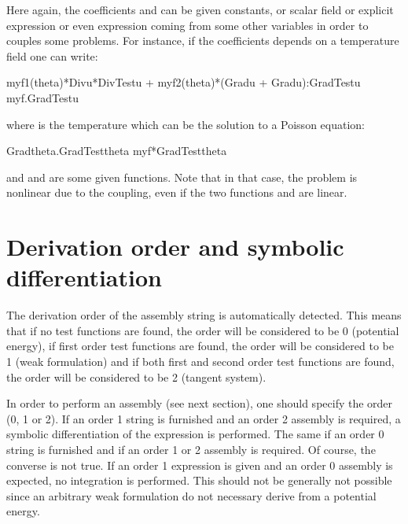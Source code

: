 \documentclass[a4paper,11pt,english]{sphinxmanual}
\begin{document}
Here again, the coefficients  and  can be given constants, or scalar field or explicit expression or even expression coming from some other variables in order to couples some problems. For instance, if the coefficients depends on a temperature field one can write:

\begin{sphinxVerbatim}[commandchars=\\\{\}]
\PYGZdq{}my\PYGZus{}f1(theta)*Div\PYGZus{}u*Div\PYGZus{}Test\PYGZus{}u + my\PYGZus{}f2(theta)*(Grad\PYGZus{}u + Grad\PYGZus{}u\PYGZsq{}):Grad\PYGZus{}Test\PYGZus{}u \PYGZhy{} my\PYGZus{}f.Grad\PYGZus{}Test\PYGZus{}u\PYGZdq{}
\end{sphinxVerbatim}

where  is the temperature which can be the solution to a Poisson equation:

\begin{sphinxVerbatim}[commandchars=\\\{\}]
\PYGZdq{}Grad\PYGZus{}theta.Grad\PYGZus{}Test\PYGZus{}theta \PYGZhy{} my\PYGZus{}f*Grad\PYGZus{}Test\PYGZus{}theta\PYGZdq{}
\end{sphinxVerbatim}

and  and  are some given functions. Note that in that case, the problem is nonlinear due to the coupling, even if the two functions   and  are linear.


\section{Derivation order and symbolic differentiation}
\label{\detokenize{userdoc/gasm_high:derivation-order-and-symbolic-differentiation}}
The derivation order of the assembly string is automatically detected. This means that if no test functions are found, the order will be considered to be 0 (potential energy), if first order test functions are found, the order will be considered to be 1 (weak formulation) and if both first and second order test functions are found, the order will be considered to be 2 (tangent system).

In order to perform an assembly (see next section), one should specify the order (0, 1 or 2). If an order 1 string is furnished and an order 2 assembly is required, a symbolic differentiation of the expression is performed. The same if an order 0 string is furnished and if an order 1 or 2 assembly is required. Of course, the converse is not true. If an order 1 expression is given and an order 0 assembly is expected, no integration is performed. This should not be generally not possible since an arbitrary weak formulation do not necessary derive from a potential energy.
\end{document}
